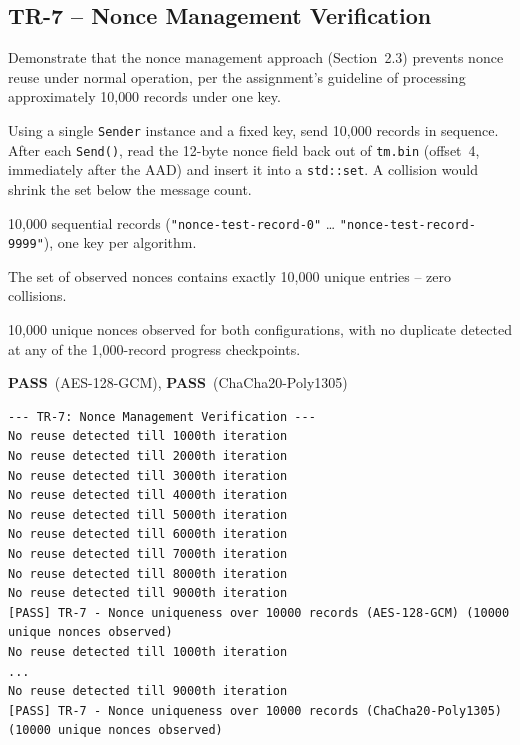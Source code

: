 \documentclass[11pt]{article}
\newcommand{\PASS}{\textcolor{passgreen}{\textbf{PASS}}}
\begin{document}
\subsection{TR-7 -- Nonce Management Verification}
\label{sec:tr7}

\begin{description}[leftmargin=2.2cm,style=nextline]
\item[Objective] Demonstrate that the nonce management approach (Section~2.3) prevents
nonce reuse under normal operation, per the assignment's guideline of processing
approximately 10{,}000 records under one key.
\item[Procedure] Using a single \texttt{Sender} instance and a fixed key, send 10{,}000
records in sequence. After each \texttt{Send()}, read the 12-byte nonce field back out
of \texttt{tm.bin} (offset~4, immediately after the AAD) and insert it into a
\texttt{std::set}. A collision would shrink the set below the message count.
\item[Test Input] 10{,}000 sequential records (\texttt{"nonce-test-record-0"} \dots
\texttt{"nonce-test-record-9999"}), one key per algorithm.
\item[Expected Behaviour] The set of observed nonces contains exactly 10{,}000 unique
entries -- zero collisions.
\item[Observed Behaviour] 10{,}000 unique nonces observed for both configurations, with
no duplicate detected at any of the 1{,}000-record progress checkpoints.
\item[Outcome] \PASS\ (AES-128-GCM), \PASS\ (ChaCha20-Poly1305)
\end{description}
\begin{lstlisting}[style=console]
--- TR-7: Nonce Management Verification ---
No reuse detected till 1000th iteration
No reuse detected till 2000th iteration
No reuse detected till 3000th iteration
No reuse detected till 4000th iteration
No reuse detected till 5000th iteration
No reuse detected till 6000th iteration
No reuse detected till 7000th iteration
No reuse detected till 8000th iteration
No reuse detected till 9000th iteration
[PASS] TR-7 - Nonce uniqueness over 10000 records (AES-128-GCM) (10000 unique nonces observed)
No reuse detected till 1000th iteration
...
No reuse detected till 9000th iteration
[PASS] TR-7 - Nonce uniqueness over 10000 records (ChaCha20-Poly1305) (10000 unique nonces observed)
\end{lstlisting}
\end{document}
